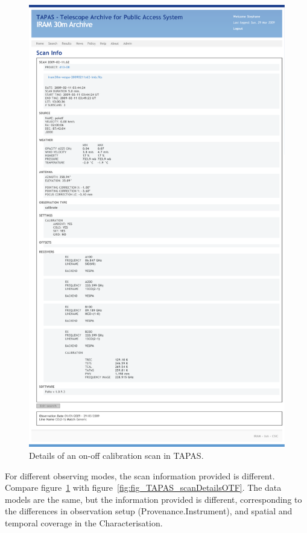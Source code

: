 			\begin{figure}[htbp]
				\centering
					\includegraphics[totalheight=\textheight]
					{fig/TAPAS_scanDetails.pdf}
				\caption[TAPAS scan detail for an on-off
				calibration]
				{Details of an on-off calibration scan in TAPAS.}
				\label{fig:fig_TAPAS_scanDetails}
			\end{figure}
			
			For different observing modes, the scan information
			provided is different. Compare
			figure~\ref{fig:fig_TAPAS_scanDetails} with
			figure~\ref{fig:fig_TAPAS_scanDetailsOTF}. The
			data models are the same, but the information
			provided is different, corresponding to the differences
			in observation setup (Provenance.Instrument), and
			spatial and temporal coverage in the Characterisation.
			
